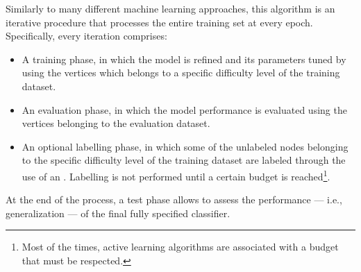             Similarly to many different machine learning approaches, this algorithm is an iterative procedure that processes the entire training set at every epoch. Specifically, every iteration comprises:
            \begin{itemize}
                \item A training phase, in which the model is refined and its parameters tuned by using the vertices which belongs to a specific difficulty level of the training dataset.
                \item An evaluation phase, in which the model performance is evaluated using the vertices belonging to the evaluation dataset.
                \item An optional labelling phase, in which some of the unlabeled nodes belonging to the specific difficulty level of the training dataset are labeled through the use of an . Labelling is not performed until a certain budget is reached\footnote{Most of the times, active learning algorithms are associated with a budget that must be respected.}.
            \end{itemize}
            At the end of the process, a test phase allows to assess the performance --- i.e., generalization --- of the final fully specified classifier.
